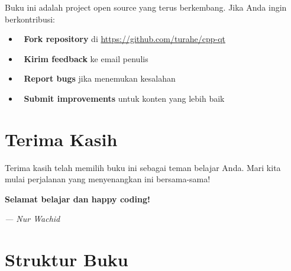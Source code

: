 Buku ini adalah project open source yang terus berkembang. Jika Anda ingin berkontribusi:

\begin{itemize}
\item 🌟 \textbf{Fork repository} di \url{https://github.com/turahe/cpp-qt}
\item 📧 \textbf{Kirim feedback} ke email penulis
\item 🐛 \textbf{Report bugs} jika menemukan kesalahan
\item 📝 \textbf{Submit improvements} untuk konten yang lebih baik
\end{itemize}

\section*{Terima Kasih}

Terima kasih telah memilih buku ini sebagai teman belajar Anda. Mari kita mulai perjalanan yang menyenangkan ini bersama-sama!

\begin{center}
\textbf{Selamat belajar dan happy coding! 🎉}

\vspace{1cm}
\textit{--- Nur Wachid}
\end{center}

\section*{Struktur Buku}


